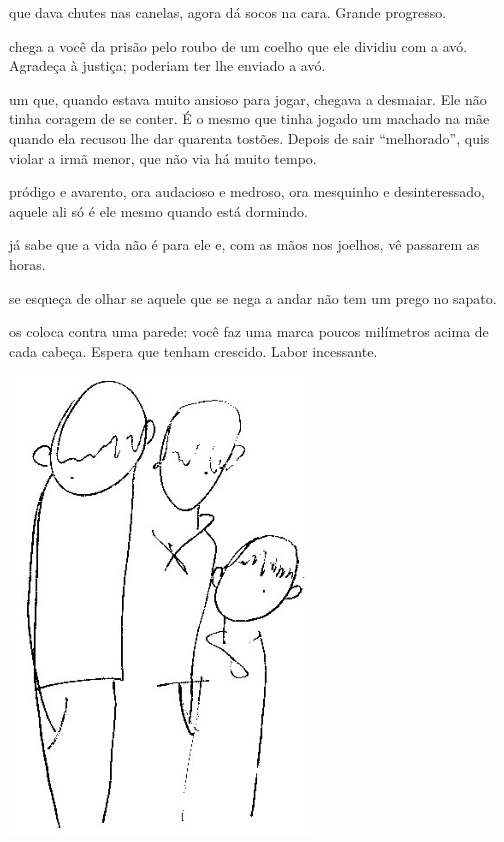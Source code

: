 \bigskip
\bigskip

 que dava chutes nas canelas, agora dá socos na cara. Grande
progresso.

\bigskip
\bigskip

 chega a você da prisão pelo roubo de um coelho que ele dividiu com a
avó. Agradeça à justiça; poderiam ter lhe enviado a avó.

\bigskip
\bigskip

 um que, quando estava muito ansioso para jogar, chegava a
desmaiar. Ele não tinha coragem de se conter. É o mesmo que tinha jogado
um machado na mãe quando ela recusou lhe dar quarenta tostões. Depois de
sair ``melhorado'', quis violar a irmã menor, que não via há muito
tempo.

\bigskip
\bigskip

 pródigo e avarento, ora audacioso e medroso, ora mesquinho e
desinteressado, aquele ali só é ele mesmo quando está dormindo.

\bigskip
\bigskip

 já sabe que a vida não é para ele e, com as mãos nos joelhos, vê
passarem as horas.

\bigskip
\bigskip

 se esqueça de olhar se aquele que se nega a andar não tem um prego
no sapato.

\bigskip
\bigskip

 os coloca contra uma parede: você faz uma marca poucos milímetros
acima de cada cabeça. Espera que tenham crescido. Labor incessante.

\bigskip
\bigskip

\pagebreak
\thispagestyle{empty}

\begin{vplace}[.50]
\begin{center}
\includegraphics[width=80mm]{./imgs/Image_6.jpg}
\end{center}
\end{vplace}


